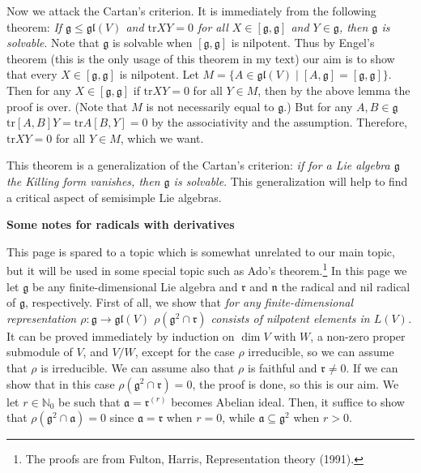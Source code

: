 \documentclass{article}
\newcommand{\NaN}{\mathbb{N}}
\newcommand{\SBar}{\;|\;}
\newcommand{\tr}[1]{\mathrm{tr}#1}
\newcommand{\lie}[1]{\mathfrak{#1}}
\begin{document}
Now we attack the Cartan's criterion.
It is immediately from the following theorem: \textit{If $\lie{g} \le \lie{gl}(V)$ and $\tr{XY} = 0$ for all $X \in [\lie{g}, \lie{g}]$ and $Y \in \lie{g}$, then $\lie{g}$ is solvable}.
Note that $\lie{g}$ is solvable when $[\lie{g}, \lie{g}]$ is nilpotent.
Thus by Engel's theorem (this is the only usage of this theorem in my text) our aim is to show that every $X \in [\lie{g}, \lie{g}]$ is nilpotent.
Let $M = \{A \in \lie{gl}(V) \SBar [A, \lie{g}] = [\lie{g}, \lie{g}] \}$.
Then for any $X \in [\lie{g}, \lie{g}]$ if $\tr{XY} = 0$ for all $Y \in M$, then by the above lemma the proof is over.
(Note that $M$ is not necessarily equal to $\lie{g}$.)
But for any $A, B \in \lie{g}$ $\tr{[A, B]Y} = \tr{A[B, Y]} = 0$ by the associativity and the assumption.
Therefore, $\tr{XY} = 0$ for all $Y \in M$, which we want.

This theorem is a generalization of the Cartan's criterion: \textit{if for a Lie algebra $\lie{g}$ the Killing form vanishes, then $\lie{g}$ is solvable}.
This generalization will help to find a critical aspect of semisimple Lie algebras.

\newpage

\textbf{Some notes for radicals with derivatives}

This page is spared to a topic which is somewhat unrelated to our main topic, but it will be used in some special topic such as Ado's theorem.\footnote{The proofs are from Fulton, Harris, Representation theory (1991).}
In this page we let $\lie{g}$ be any finite-dimensional Lie algebra and $\lie{r}$ and $\lie{n}$ the radical and nil radical of $\lie{g}$, respectively.
First of all, we show that \textit{for any finite-dimensional representation $\rho : \lie{g} \to \lie{gl}(V)$ $\rho(\lie{g}^2 \cap \lie{r})$ consists of nilpotent elements in $L(V)$.}
It can be proved immediately by induction on $\dim{V}$ with $W$, a non-zero proper submodule of $V$, and $V/W$, except for the case $\rho$ irreducible, so we can assume that $\rho$ is irreducible.
We can assume also that $\rho$ is faithful and $\lie{r} \ne 0$.
If we can show that in this case $\rho(\lie{g}^2 \cap \lie{r}) = 0$, the proof is done, so this is our aim.
We let $r \in \NaN_0$ be such that $\lie{a} = \lie{r}^{(r)}$ becomes Abelian ideal.
Then, it suffice to show that $\rho(\lie{g}^2 \cap \lie{a}) = 0$ since $\lie{a} = \lie{r}$ when $r = 0$, while $\lie{a} \subseteq \lie{g}^2$ when $r > 0$.
\end{document}
